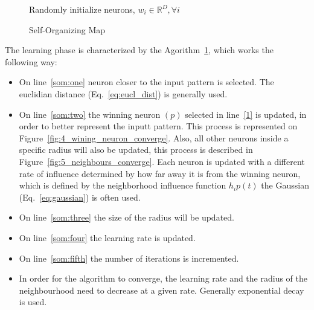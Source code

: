 \begin{figure}[h]
  \begin{algorithm}[H]
    \label{alg:som}
    \DontPrintSemicolon
    Randomly initialize neurons, $w_i \in \mathbb{R}^{D}, \forall i $ \;
      \caption{Self-Organizing Map \cite[]{Kohonen1990} }
  \end{algorithm}
\end{figure}

The learning phase is characterized by the Agorithm~\ref{alg:som}, which works the following way:
\begin{itemize}
  \item On line~\ref{som:one} neuron closer to the input pattern is selected. The euclidian distance (Eq.~\ref{eq:eucl_dist}) is generally used.
    
  \item On line~\ref{som:two} the winning neuron $(p)$ selected in line~\ref{1} is updated, in order to better represent the inputt pattern. This process is represented on Figure~\ref{fig:4_wining_neuron_converge}. Also, all other neurons inside a specific radius will also be updated, this process is described in Figure~\ref{fig:5_neighbours_converge}. Each neuron is updated with a different rate of influence determined by how far away it is from the winning neuron, which is defined by the neighborhood influence function $h_ip(t)$ the Gaussian (Eq.~\ref{eq:gaussian}) is often used. 
    
  \item On line~\ref{som:three} the size of the radius will be updated.
  \item On line~\ref{som:four} the learning rate is updated.
  \item On line~\ref{som:fifth} the number of iterations is incremented.
  \item In order for the algorithm to converge, the learning rate and the radius of the neighbourhood need to decrease at a given rate. Generally exponential decay is used.
\end{itemize}
 
